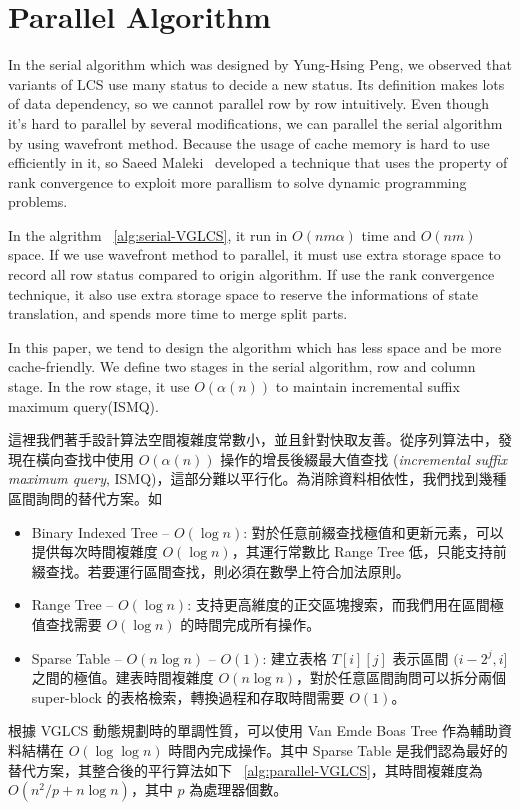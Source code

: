 \section{Parallel Algorithm} %
\label{sec:parallelSerial}

In the serial algorithm which was designed by Yung-Hsing Peng, we observed that variants of LCS use many status to decide a new status. Its definition makes lots of data dependency, so we cannot parallel row by row intuitively. Even though it's hard to parallel by several modifications, we can parallel the serial algorithm by using wavefront method. Because the usage of cache  memory is hard to use efficiently in it, so Saeed Maleki~\cite{saeed} developed a technique that uses the property of rank convergence to exploit more parallism to solve dynamic programming problems.



In the algrithm ~\ref{alg:serial-VGLCS}, it run in $O(nm \alpha)$ time and $O(nm)$ space. If we use wavefront method to parallel, it must use extra storage space to record all row status compared to origin algorithm. If use the rank convergence technique, it also use extra storage space to reserve the informations of state translation, and spends more time to merge split parts.

In this paper, we tend to design the algorithm which has less space and be more cache-friendly. We define two stages in the serial algorithm, row and column stage. In the row stage, it use $O(\alpha(n))$ to maintain incremental suffix maximum query(ISMQ).



這裡我們著手設計算法空間複雜度常數小，並且針對快取友善。從序列算法中，發現在橫向查找中使用 $O(\alpha(n))$ 操作的增長後綴最大值查找 (\emph{incremental suffix maximum query}, ISMQ)，這部分難以平行化。為消除資料相依性，我們找到幾種區間詢問的替代方案。如 

\begin{itemize}
  \item Binary Indexed Tree -- $O(\log n)$: 對於任意前綴查找極值和更新元素，可以提供每次時間複雜度 $O(\log n)$，其運行常數比 Range Tree 低，只能支持前綴查找。若要運行區間查找，則必須在數學上符合加法原則。
  \item Range Tree -- $O(\log n)$: 支持更高維度的正交區塊搜索，而我們用在區間極值查找需要 $O(\log n)$ 的時間完成所有操作。
  \item Sparse Table -- $O(n \log n)$ -- $O(1)$:
    建立表格 $T[i][j]$ 表示區間 $(i-2^j,i]$ 之間的極值。建表時間複雜度 $O(n \log n)$，對於任意區間詢問可以拆分兩個 super-block 的表格檢索，轉換過程和存取時間需要 $O(1)$。
\end{itemize}

根據 VGLCS 動態規劃時的單調性質，可以使用 Van Emde Boas Tree 作為輔助資料結構在 $O(\log \log n)$ 時間內完成操作。其中 Sparse Table 是我們認為最好的替代方案，其整合後的平行算法如下 ~\ref{alg:parallel-VGLCS}，其時間複雜度為 $O(n^2 / p + n \log n)$，其中 $p$ 為處理器個數。

